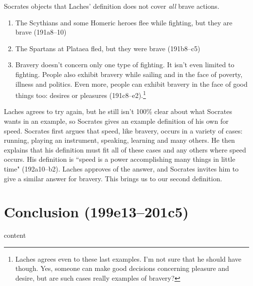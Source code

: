 \documentclass[11pt]{article}
\begin{document}
Socrates objects that Laches' definition does not cover \emph{all} brave actions.

\begin{enumerate}
    \item The Scythians and some Homeric heroes flee while fighting, but they are brave (191a8--10)
    \item The Spartans at Plataea fled, but they were brave (191b8--c5)
    \item Bravery doesn't concern only one type of fighting.  It isn't even limited to fighting.  People also exhibit bravery while sailing and in the face of poverty, illness and politics.  Even more, people can exhibit bravery in the face of good things too: desires or pleasures (191c8--e2).\footnote{Laches agrees even to these last examples.  I'm not sure that he should have though.  Yes, someone can make good decisions concerning pleasure and desire, but are such cases really examples of bravery?}
\end{enumerate}

Laches agrees to try again, but he still isn't 100\% clear about what Socrates wants in an example, so Socrates gives an example definition of his own for speed.  Socrates first argues that speed, like bravery, occurs in a variety of cases: running, playing an instrument, speaking, learning and many others.  He then explains that his definition must fit all of these cases and any others where speed occurs.  His definition is ``speed is a power accomplishing many things in little time" (192a10--b2).  Laches approves of the answer, and Socrates invites him to give a similar answer for bravery.  This brings us to our second definition.



\section{Conclusion (199e13--201c5)}

content


\newpage


\end{document}
